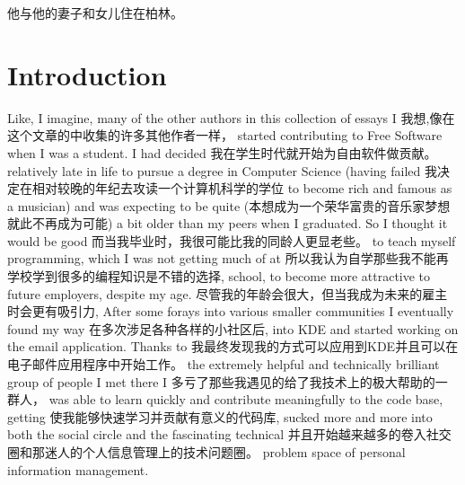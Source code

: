 
他与他的妻子和女儿住在柏林。
\section*{Introduction}

Like, I imagine, many of the other authors in this collection of essays I
我想,像在这个文章的中收集的许多其他作者一样，
started contributing to Free Software when I was a student. I had decided
我在学生时代就开始为自由软件做贡献。
relatively late in life to pursue a degree in Computer Science (having failed
我决定在相对较晚的年纪去攻读一个计算机科学的学位
to become rich and famous as a musician) and was expecting to be quite
(本想成为一个荣华富贵的音乐家梦想就此不再成为可能)
a bit older than my peers when I graduated. So I thought it would be good
而当我毕业时，我很可能比我的同龄人更显老些。
to teach myself programming, which I was not getting much of at
所以我认为自学那些我不能再学校学到很多的编程知识是不错的选择,
school, to become more attractive to future employers, despite my age.
尽管我的年龄会很大，但当我成为未来的雇主时会更有吸引力,
After some forays into various smaller communities I eventually found my way
在多次涉足各种各样的小社区后,
into KDE and started working on the email application. Thanks to
我最终发现我的方式可以应用到KDE并且可以在电子邮件应用程序中开始工作。
the extremely helpful and technically brilliant group of people I met there I
多亏了那些我遇见的给了我技术上的极大帮助的一群人，
was able to learn quickly and contribute meaningfully to the code base, getting
使我能够快速学习并贡献有意义的代码库,
sucked more and more into both the social circle and the fascinating technical
并且开始越来越多的卷入社交圈和那迷人的个人信息管理上的技术问题圈。
problem space of personal information management.

